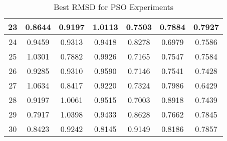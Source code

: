 \begin{table}
\begin{tabular}{ | c | c | c | c | c | c | c | }
		23 & 0.8644 & 0.9197 & 1.0113 & 0.7503 & 0.7884 & 0.7927 \\ \hline
		24 & 0.9459 & 0.9313 & 0.9418 & 0.8278 & 0.6979 & 0.7586 \\ \hline
		25 & 1.0301 & 0.7882 & 0.9926 & 0.7165 & 0.7547 & 0.7584 \\ \hline
		26 & 0.9285 & 0.9310 & 0.9590 & 0.7146 & 0.7541 & 0.7428 \\ \hline
		27 & 1.0634 & 0.8417 & 0.9220 & 0.7324 & 0.7986 & 0.6429 \\ \hline
		28 & 0.9197 & 1.0061 & 0.9515 & 0.7003 & 0.8918 & 0.7439 \\ \hline
		29 & 0.7917 & 1.0398 & 0.9433 & 0.8628 & 0.7662 & 0.7845 \\ \hline
		30 & 0.8423 & 0.9242 & 0.8145 & 0.9149 & 0.8186 & 0.7857 \\ \hline
	\end{tabular}
	\caption{Best RMSD for PSO Experiments}
\end{table}

